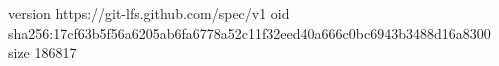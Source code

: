 version https://git-lfs.github.com/spec/v1
oid sha256:17cf63b5f56a6205ab6fa6778a52c11f32eed40a666c0bc6943b3488d16a8300
size 186817
